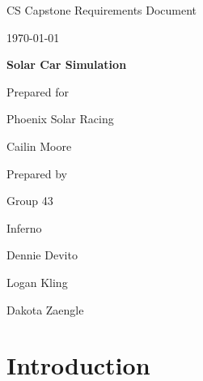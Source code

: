 \documentclass[onecolumn, draftclsnofoot,10pt, compsoc]{IEEEtran}
\def \CapstoneTeamName{		Inferno}
\def \CapstoneTeamNumber{		43}
\def \GroupMemberOne{			Dennie Devito}
\def \GroupMemberTwo{			Logan Kling}
\def \GroupMemberThree{			Dakota Zaengle}
\def \CapstoneProjectName{		Solar Car Simulation}
\def \CapstoneSponsorCompany{	Phoenix Solar Racing}
\def \CapstoneSponsorPerson{		Cailin Moore}
\def \DocType{		%
				Requirements Document
				}
\newcommand{\NameSigPair}[1]{\par
\makebox[2.75in][r]{#1} \hfil 	\makebox[3.25in]{\makebox[2.25in]{\hrulefill} \hfill		\makebox[.75in]{\hrulefill}}
\par\vspace{-12pt} \textit{\tiny\noindent
\makebox[2.75in]{} \hfil		\makebox[3.25in]{\makebox[2.25in][r]{Signature} \hfill	\makebox[.75in][r]{Date}}}}
\renewcommand{\NameSigPair}[1]{#1}
\begin{document}
\begin{titlepage}
    \begin{singlespace}
        \hfill 
        \par\vspace{.2in}
        \centering
        \scshape{
            \huge CS Capstone \DocType \par
            {\large\today}\par
            \vspace{.5in}
            \textbf{\Huge\CapstoneProjectName}\par
            \vfill
            {\large Prepared for}\par
            \Huge \CapstoneSponsorCompany\par
            \vspace{5pt}
            {\Large\NameSigPair{\CapstoneSponsorPerson}\par}
            {\large Prepared by }\par
            Group\CapstoneTeamNumber\par
            \CapstoneTeamName\par 
            \vspace{5pt}
            {\Large
                \NameSigPair{\GroupMemberOne}\par
                \NameSigPair{\GroupMemberTwo}\par
                \NameSigPair{\GroupMemberThree}\par
            }
            \vspace{20pt}
        }
        \begin{abstract}
        	

        \end{abstract}     
    \end{singlespace}
\end{titlepage}
\newpage
{}
\tableofcontents
\clearpage

\section{Introduction}
    
\end{document}
